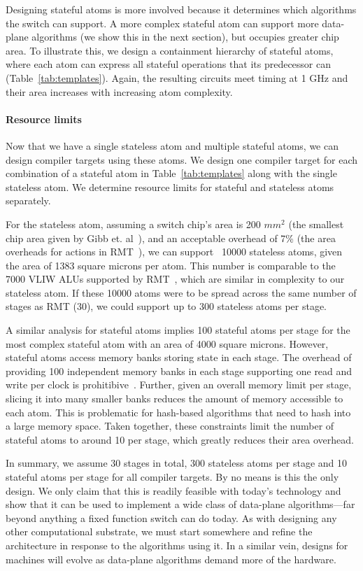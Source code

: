 Designing stateful atoms is more involved because it determines which
algorithms the switch can support. A more complex stateful atom can support
more data-plane algorithms (we show this in the next section), but occupies
greater chip area. To illustrate this, we design a containment hierarchy of
stateful atoms, where each atom can express all stateful operations that its
predecessor can (Table~\ref{tab:templates}). Again, the resulting circuits meet
timing at 1 GHz and their area increases with increasing atom complexity.

\paragraph{Resource limits}
Now that we have a single stateless atom and multiple stateful atoms, we can
design compiler targets using these atoms.  We design one compiler target for
each combination of a stateful atom in Table~\ref{tab:templates} along with the
single stateless atom. We determine resource limits for stateful and stateless
atoms separately.

For the stateless atom, assuming a switch chip's area is 200 $mm^2$ (the
smallest chip area given by Gibb et. al~\cite{gibb_parsing}), and an acceptable
overhead of 7\% (the area overheads for actions in RMT~\cite{rmt}), we can
support ~10000 stateless atoms, given the area of 1383 square microns per atom.
This number is comparable to the 7000 VLIW ALUs supported by RMT~\cite{rmt},
which are similar in complexity to our stateless atom. If these 10000 atoms
were to be spread across the same number of stages as RMT (30), we could
support up to 300 stateless atoms per stage.

A similar analysis for stateful atoms implies 100 stateful atoms per stage for
the most complex stateful atom with an area of 4000 square microns.  However,
stateful atoms access memory banks storing state in each stage. The overhead of
providing 100 independent memory banks in each stage supporting one read and
write per clock is prohitibive~\cite{private_conversations_with_mike}.
Further, given an overall memory limit per stage, slicing it into many smaller
banks reduces the amount of memory accessible to each atom. This is problematic
for hash-based algorithms that need to hash into a large memory space. Taken
together, these constraints limit the number of stateful atoms to around 10 per
stage, which greatly reduces their area overhead.

In summary, we assume 30 stages in total, 300 stateless atoms per stage and 10
stateful atoms per stage for all compiler targets. By no means is this the only
design. We only claim that this is readily feasible with today's technology and
show that it can be used to implement a wide class of data-plane
algorithms---far beyond anything a fixed function switch can do today. As with
designing any other computational substrate, we must start somewhere and refine
the architecture in response to the algorithms using it.  In a similar vein,
designs for \absmachine machines will evolve as data-plane algorithms demand
more of the hardware.

